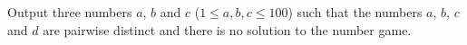 
  Output three numbers $a$, $b$ and $c$ ($1 \le a,b,c \le 100$) such that the
  numbers $a$, $b$, $c$ and $d$ are pairwise distinct and there is no solution
  to the number game.
